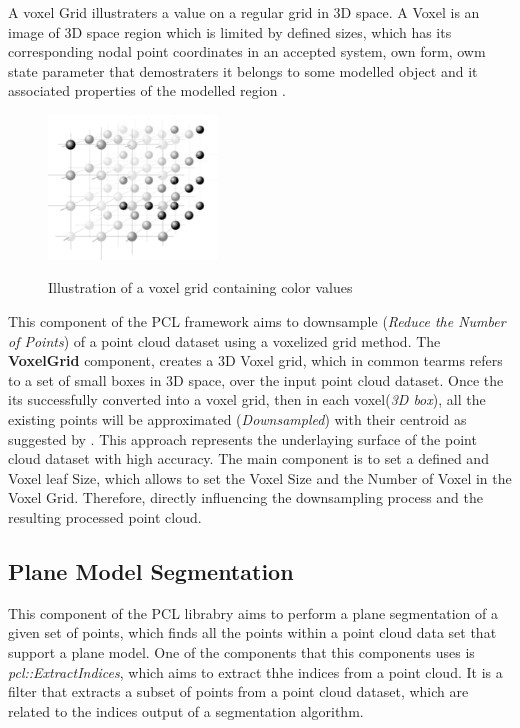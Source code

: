 \documentclass[12pt]{report}
\begin{document}
A voxel Grid illustraters a value on a regular grid in 3D space. A Voxel is an image of 3D space region  which is limited by defined sizes, which has its corresponding nodal point coordinates in an accepted system,
own form, owm state parameter that demostraters it belongs to some modelled object and it associated properties of the modelled region . 

\begin{figure}[H]%
  \centering
  \includegraphics[width=0.4\textwidth]{220px-Voxelgitter.png}
 \caption{Illustration of a voxel grid containing color values}\cite[]{SHCHUROVA201576}
 \label{fig:voxel_repre} 
\end{figure}

This component of the PCL  framework aims to downsample (\textit{Reduce the Number of Points}) of a point cloud dataset using a voxelized grid method.
The \textbf{VoxelGrid} component, creates a 3D Voxel grid, which in common tearms refers to a set of small boxes in 3D space, over the input point cloud dataset. 
Once the its successfully converted into a voxel grid, then in each voxel(\textit{3D box}), all the existing points will be approximated (\textit{Downsampled}) with their centroid as suggested by .
This approach represents the underlaying surface of the point cloud dataset with high accuracy.
The main component is to set a defined and Voxel leaf Size, which allows to set the Voxel Size and the Number of Voxel in the Voxel Grid. Therefore, directly influencing the downsampling process and the resulting processed point cloud.

\subsection{Plane Model Segmentation}
\label{section:Plane Model Segmentation}
This component of the PCL librabry aims to perform a plane segmentation of a given set of points, which finds all the points within a point cloud data set that support a plane model.
One of the components that this components uses is \textit{pcl::ExtractIndices}, which aims to extract thhe indices from a point cloud.
It is a filter that extracts a subset of points from a point cloud dataset, which are related to the indices output of a segmentation algorithm.
\end{document}
